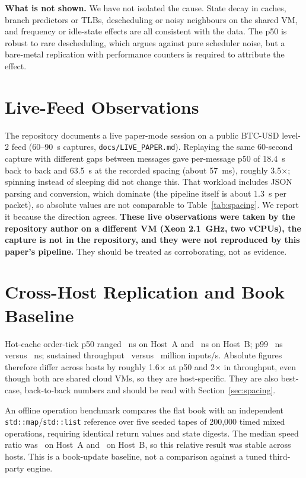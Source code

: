 \documentclass[conference]{IEEEtran}
\begin{document}
\textbf{What is not shown.} We have not isolated the cause. State decay in caches, branch predictors or TLBs, descheduling or noisy neighbours on the shared VM, and frequency or idle-state effects are all consistent with the data. The p50 is robust to rare descheduling, which argues against pure scheduler noise, but a bare-metal replication with performance counters is required to attribute the effect.

\section{Live-Feed Observations}\label{sec:live}
The repository documents a live paper-mode session on a public BTC-USD level-2 feed (60--90~s captures, \texttt{docs/LIVE\_PAPER.md}). Replaying the same 60-second capture with different gaps between messages gave per-message p50 of 18.4~\textmu s back to back and 63.5~\textmu s at the recorded spacing (about 57~ms), roughly 3.5$\times$; spinning instead of sleeping did not change this. That workload includes JSON parsing and conversion, which dominate (the pipeline itself is about 1.3~\textmu s per packet), so absolute values are not comparable to Table~\ref{tab:spacing}. We report it because the direction agrees. \textbf{These live observations were taken by the repository author on a different VM (Xeon 2.1~GHz, two vCPUs), the capture is not in the repository, and they were not reproduced by this paper's pipeline.} They should be treated as corroborating, not as evidence.

\section{Cross-Host Replication and Book Baseline}\label{sec:host}
Hot-cache order-tick p50 ranged \HotMedianRange~ns on Host~A and \HostBHotMedianRange~ns on Host~B; p99 \HotPninetyRange~ns versus \HostBHotPninetyRange~ns; sustained throughput \ThroughputRange\ versus \HostBThroughputRange\ million inputs/s. Absolute figures therefore differ across hosts by roughly 1.6$\times$ at p50 and 2$\times$ in throughput, even though both are shared cloud VMs, so they are host-specific. They are also best-case, back-to-back numbers and should be read with Section~\ref{sec:spacing}.

An offline operation benchmark compares the flat book with an independent \texttt{std::map}/\texttt{std::list} reference over five seeded tapes of 200{,}000 timed mixed operations, requiring identical return values and state digests. The median speed ratio was \BookSpeedup\ on Host~A and \HostBBookSpeedup\ on Host~B, so this relative result was stable across hosts. This is a book-update baseline, not a comparison against a tuned third-party engine.
\end{document}

